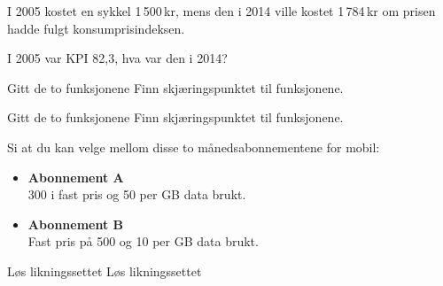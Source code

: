 I 2005 kostet en sykkel 1\,500\,kr, mens den i 2014 ville kostet 1\,784\,kr om prisen hadde fulgt konsumprisindeksen. \os

I 2005 var KPI 82,3, hva var den i 2014?

\nes
{}
Gitt de to funksjonene
Finn skjæringspunktet til funksjonene.

Gitt de to funksjonene
Finn skjæringspunktet til funksjonene.

Si at du kan velge mellom disse to månedsabonnementene for mobil:
\begin{itemize}
	\item \textbf{Abonnement A} \\
	300 i fast pris og 50 per GB data brukt.
	\item \textbf{Abonnement B} \\
	Fast pris på 500 og 10 per GB data brukt.
\end{itemize}



\nes
{}
Løs likningssettet
Løs likningssettet


